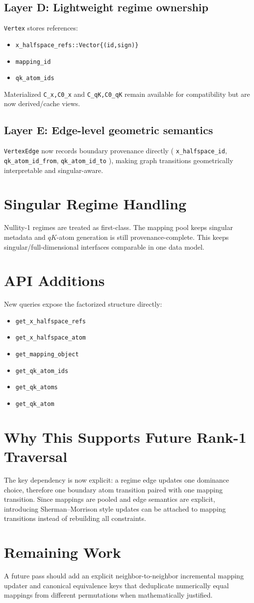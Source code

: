 \documentclass[11pt]{article}
\begin{document}
\subsection{Layer D: Lightweight regime ownership}
\texttt{Vertex} stores references:
\begin{itemize}[leftmargin=1.5em]
\item \texttt{x\_halfspace\_refs::Vector\{(id,sign)\}}
\item \texttt{mapping\_id}
\item \texttt{qk\_atom\_ids}
\end{itemize}
Materialized \texttt{C\_x,C0\_x} and \texttt{C\_qK,C0\_qK} remain available for compatibility but are now derived/cache views.

\subsection{Layer E: Edge-level geometric semantics}
\texttt{VertexEdge} now records boundary provenance directly (
\texttt{x\_halfspace\_id}, \texttt{qk\_atom\_id\_from}, \texttt{qk\_atom\_id\_to}
), making graph transitions geometrically interpretable and singular-aware.

\section{Singular Regime Handling}
Nullity-1 regimes are treated as first-class. The mapping pool keeps singular metadata and $qK$-atom generation is still provenance-complete. This keeps singular/full-dimensional interfaces comparable in one data model.

\section{API Additions}
New queries expose the factorized structure directly:
\begin{itemize}[leftmargin=1.5em]
\item \texttt{get\_x\_halfspace\_refs}
\item \texttt{get\_x\_halfspace\_atom}
\item \texttt{get\_mapping\_object}
\item \texttt{get\_qk\_atom\_ids}
\item \texttt{get\_qk\_atoms}
\item \texttt{get\_qk\_atom}
\end{itemize}

\section{Why This Supports Future Rank-1 Traversal}
The key dependency is now explicit: a regime edge updates one dominance choice, therefore one boundary atom transition paired with one mapping transition. Since mappings are pooled and edge semantics are explicit, introducing Sherman--Morrison style updates can be attached to mapping transitions instead of rebuilding all constraints.

\section{Remaining Work}
A future pass should add an explicit neighbor-to-neighbor incremental mapping updater and canonical equivalence keys that deduplicate numerically equal mappings from different permutations when mathematically justified.
\end{document}
